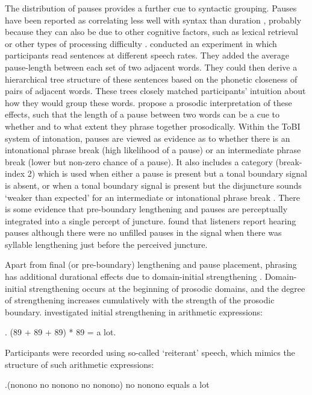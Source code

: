 \documentclass[preprint,review,12pt,authoryear,times]{elsarticle}
\begin{document}
The distribution of pauses provides a further cue to syntactic grouping. Pauses have been reported as correlating less well with syntax than duration \citep{gollr13}, probably because they can also be due to other cognitive factors, such as lexical retrieval or other types of processing difficulty \citep{goldm72}. \citet{grosj79} conducted an experiment in which participants read sentences at different speech rates. They added the average pause-length between each set of two adjacent words. They could then derive a hierarchical tree structure of these sentences based on the phonetic closeness of pairs of adjacent words. These trees  closely matched participants' intuition about how they would group these words.  \citet{gee83} propose a prosodic interpretation of these effects, such that the length of a pause between two words can be a cue to whether and to what extent they phrase together prosodically. Within the ToBI system of intonation, pauses are viewed as evidence as to whether there is an intonational phrase break (high likelihood of a pause) or an intermediate phrase break (lower but non-zero chance of a pause). It also includes a category (break-index 2) which is used when either a pause is present but a tonal boundary signal is absent, or when a tonal boundary signal is present but the disjuncture sounds `weaker than expected' for an intermediate or intonational phrase break \citep[35]{beckm97} . There is some evidence that pre-boundary lengthening and pauses are perceptually integrated into a single percept of juncture. \citet{Marti70, Marti71} found that listeners report hearing pauses although there were no unfilled pauses in the signal when there was syllable lengthening just before the perceived juncture. 

Apart from final (or pre-boundary) lengthening and pause placement, phrasing has additional durational effects due to domain-initial strengthening  \citep{fouge97, lavoi01, cho02, keati03,keati06,cho07,cho11,cho16}. Domain-initial strengthening occurs at the beginning of prosodic domains, and the degree of strengthening increases cumulatively with the strength of the prosodic boundary.  \citet{fouge97} investigated initial strengthening in arithmetic expressions:

\ex. (89 + 89 + 89) * 89 = a lot. \label{2arithm}

\noindent Participants were recorded using so-called `reiterant' speech, which  mimics the structure of such arithmetic expressions:

\ex.(nonono no nonono no nonono) no nonono equals a lot
\end{document}
